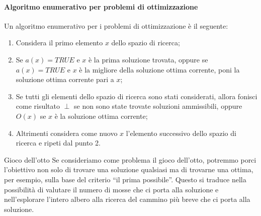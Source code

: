 \documentclass[12pt]{report}
\newcommand{\nmu}{}
\begin{document}
 	\paragraph{Algoritmo enumerativo per problemi di ottimizzazione} Un algoritmo enumerativo per i problemi di ottimizzazione è il seguente:
 	\begin{enumerate}
 		\item Considera il primo elemento $x$ dello spazio di ricerca;
 		\item Se $a(x) = TRUE$ e $x$ è la prima soluzione trovata, oppure se $a(x) = TRUE$ e $x$ è la migliore della soluzione ottima corrente, poni la soluzione ottima corrente pari a $x$;
 		\item Se tutti gli elementi dello spazio di ricerca sono stati considerati, allora fonisci come risultato $\perp$ se non sono state trovate soluzioni ammissibili, oppure $O(x)$ se $x$ è la soluzione ottima corrente;
 		\item Altrimenti considera come nuovo $x$ l'elemento successivo dello spazio di ricerca e ripeti dal punto 2.
 	\end{enumerate}
 	\begin{example}{\nmu Gioco dell'otto}{}
 		Se consideriamo come problema il gioco dell'otto, potremmo porci l'obiettivo non solo di trovare una soluzione qualsiasi ma di trovarne una ottima, per esempio, sulla base del criterio ``il prima possibile''. Questo si traduce nella possibilità di valutare il numero di mosse che ci porta alla soluzione e nell'esplorare l'intero albero alla ricerca del cammino più breve che ci porta alla soluzione.
 	\end{example}
\end{document}
